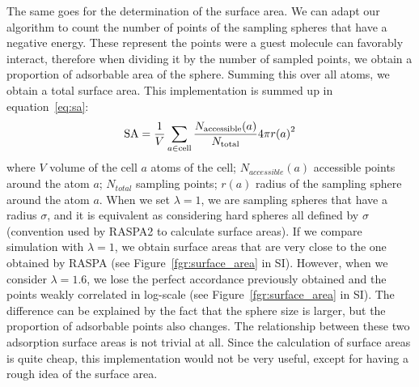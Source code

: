 \documentclass[main]{subfiles}
\begin{document}
The same goes for the determination of the surface area. We can adapt our algorithm to count the number of points of the sampling spheres that have a negative energy. These represent the points were a guest molecule can favorably interact, therefore when dividing it by the number of sampled points, we obtain a proportion of adsorbable area of the sphere. Summing this over all atoms, we obtain a total surface area. This implementation is summed up in equation~\ref{eq:sa}:
\begin{equation}
\label{eq:sa}
    \textrm{SA} = \dfrac{1}{V}\sum_{a\in \textrm{cell}} \dfrac{N_{\text{accessible}}(a)}{N_{\text{total}}}4\pi {r(a)}^2
\end{equation}
where $V$ volume of the cell $a$ atoms of the cell; $N_{accessible}(a)$ accessible points around the atom $a$; $N_{total}$ sampling points; $r(a)$ radius of the sampling sphere around the atom $a$.
When we set $\lambda=1$, we are sampling spheres that have a radius $\sigma$, and it is equivalent as considering hard spheres all defined by $\sigma$ (convention used by RASPA2 to calculate surface areas). If we compare simulation with $\lambda=1$, we obtain surface areas that are very close to the one obtained by RASPA (see Figure~\ref{fgr:surface_area} in SI). However, when we consider $\lambda=1.6$, we lose the perfect accordance previously obtained and the points weakly correlated in log-scale (see Figure~\ref{fgr:surface_area} in SI). The difference can be explained by the fact that the sphere size is larger, but the proportion of adsorbable points also changes. The relationship between these two adsorption surface areas is not trivial at all. Since the calculation of surface areas is quite cheap, this implementation would not be very useful, except for having a rough idea of the surface area.
\end{document}
